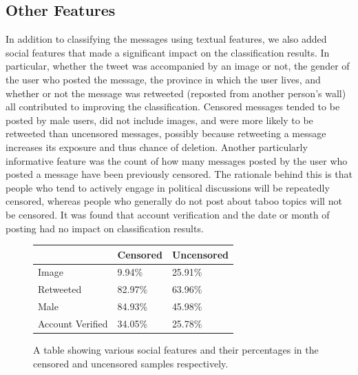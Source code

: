 \documentclass{article} %
\begin{document}
\begin{CJK*}{UTF8}{gbsn}
\subsection{Other Features}
In addition to classifying the messages using textual features, we also added social features that made a significant impact on the classification results. In particular, whether the tweet was accompanied by an image or not, the gender of the user who posted the message, the province in which the user lives, and whether or not the message was retweeted (reposted from another person's wall) all contributed to improving the classification. Censored messages tended to be posted by male users, did not include images, and were more likely to be retweeted than uncensored messages, possibly because retweeting a message increases its exposure and thus chance of deletion. Another particularly informative feature was the count of how many messages posted by the user who posted a message have been previously censored. The rationale behind this is that people who tend to actively engage in political discussions will be repeatedly censored, whereas people who generally do not post about taboo topics will not be censored. It was found that account verification and the date or month of posting had no impact on classification results. 

\begin{figure}[!htb]
	\begin{center}
		    \begin{tabular}{ | l | l | l |}
		    \hline
		    & Censored & Uncensored \\\hline
		    Image & 9.94\%& 25.91\% \\ \hline
		   	Retweeted & 82.97\% & 63.96\% \\ \hline
		  	Male & 84.93\% & 45.98\% \\\hline
		   	Account Verified & 34.05\% & 25.78\%\\\hline

		    \end{tabular}
	\end{center}
\caption{A table showing various social features and their percentages in the censored and uncensored samples respectively.}
\vspace{-10pt}
\end{figure}


\end{CJK*}
\end{document}
